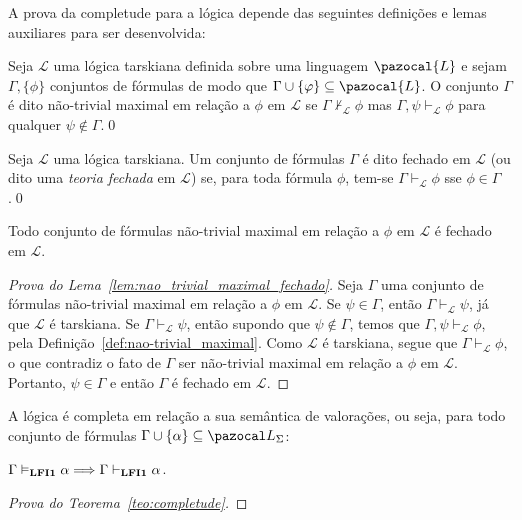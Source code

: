     A prova da completude para a lógica \lfium{} depende das seguintes definições e lemas auxiliares para ser desenvolvida:

    \begin{definicao}\label{def:nao-trivial_maximal}
        Seja $\mathcal{L}$ uma lógica tarskiana definida sobre uma linguagem $\pazocal{L}$ e sejam $\Gamma, \{\phi\}$ conjuntos de fórmulas de modo que $\Gamma \cup \{\phi\} \subseteq \pazocal{L}$. O conjunto $\Gamma$ é dito não-trivial maximal em relação a $\phi$ em $\mathcal{L}$ se $\Gamma \nvdash_{\mathcal{L}} \phi$ mas $\Gamma, \psi \vdash_{\mathcal{L}} \phi$ para qualquer $\psi \notin \Gamma$.\qed{}
    \end{definicao}

    \begin{definicao}\label{def:fechada}

        Seja $\mathcal{L}$ uma lógica tarskiana. Um conjunto de fórmulas $\Gamma$ é dito fechado em $\mathcal{L}$ (ou dito uma \textit{teoria fechada} em $\mathcal{L}$) se, para toda fórmula $\phi$, tem-se $\Gamma \vdash_{\mathcal{L}} \phi$ sse $\phi \in \Gamma$.\qed{}
    \end{definicao}

    \begin{lema}\label{lem:nao_trivial_maximal_fechado}
        Todo conjunto de fórmulas não-trivial maximal em relação a $\phi$ em $\mathcal{L}$ é fechado em $\mathcal{L}$.
    \end{lema}

    \begin{proof}[Prova do Lema~\ref{lem:nao_trivial_maximal_fechado}]
        Seja $\Gamma$ uma conjunto de fórmulas não-trivial maximal em relação a $\phi$ em $\mathcal{L}$. Se $\psi \in \Gamma$, então $\Gamma \vdash_{\mathcal{L}} \psi$, já que $\mathcal{L}$ é tarskiana. Se $\Gamma \vdash_{\mathcal{L}} \psi$, então supondo que $\psi \notin \Gamma$, temos que $\Gamma, \psi \vdash_{\mathcal{L}} \phi$, pela Definição~\ref{def:nao-trivial_maximal}. Como $\mathcal{L}$ é tarskiana, segue que $\Gamma \vdash_{\mathcal{L}} \phi$, o que contradiz o fato de $\Gamma$ ser não-trivial maximal em relação a $\phi$ em $\mathcal{L}$. Portanto, $\psi \in \Gamma$ e então $\Gamma$ é fechado em $\mathcal{L}$.
    \end{proof}


    \begin{teorema}[Completude]\label{teo:completude}
        A lógica {\normalfont\lfium{}} é completa em relação a sua semântica de valorações, ou seja, para todo conjunto de fórmulas $\Gamma \cup \{\alpha\} \subseteq \ling{}$:

        \centering
        {\normalfont{} $\Gamma \vDash_{{\normalfont\textbf{LFI1}}{}} \alpha \Longrightarrow \Gamma \vdash_{{\normalfont\textbf{LFI1}}{}} \alpha$.}
    \end{teorema}

    \begin{proof}[Prova do Teorema~\ref{teo:completude}]
         

    \end{proof}

